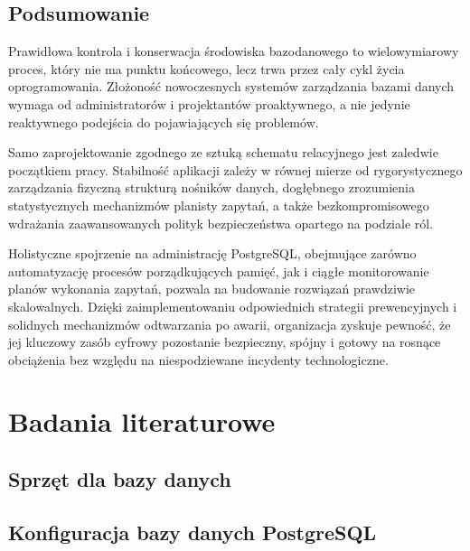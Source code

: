 \documentclass[letterpaper,10pt,english]{sphinxmanual}
\begin{document}
\section{Podsumowanie}
\label{\detokenize{rozdzial_1/index:podsumowanie}}
\sphinxAtStartPar
Prawidłowa kontrola i konserwacja środowiska bazodanowego to wielowymiarowy proces, który nie ma punktu końcowego, lecz trwa przez cały cykl życia oprogramowania. Złożoność nowoczesnych systemów zarządzania bazami danych wymaga od administratorów i projektantów proaktywnego, a nie jedynie reaktywnego podejścia do pojawiających się problemów.

\sphinxAtStartPar
Samo zaprojektowanie zgodnego ze sztuką schematu relacyjnego jest zaledwie początkiem pracy. Stabilność aplikacji zależy w równej mierze od rygorystycznego zarządzania fizyczną strukturą nośników danych, dogłębnego zrozumienia statystycznych mechanizmów planisty zapytań, a także bezkompromisowego wdrażania zaawansowanych polityk bezpieczeństwa opartego na podziale ról.

\sphinxAtStartPar
Holistyczne spojrzenie na administrację PostgreSQL, obejmujące zarówno automatyzację procesów porządkujących pamięć, jak i ciągłe monitorowanie planów wykonania zapytań, pozwala na budowanie rozwiązań prawdziwie skalowalnych. Dzięki zaimplementowaniu odpowiednich strategii prewencyjnych i solidnych mechanizmów odtwarzania po awarii, organizacja zyskuje pewność, że jej kluczowy zasób cyfrowy pozostanie bezpieczny, spójny i gotowy na rosnące obciążenia bez względu na niespodziewane incydenty technologiczne.

\sphinxstepscope


\chapter{Badania literaturowe}
\label{\detokenize{rozdzial_2/index:badania-literaturowe}}\label{\detokenize{rozdzial_2/index::doc}}
\sphinxstepscope


\section{Sprzęt dla bazy danych}
\label{\detokenize{rozdzial_2/rozdzial_21/index:sprzet-dla-bazy-danych}}\label{\detokenize{rozdzial_2/rozdzial_21/index::doc}}
\sphinxstepscope


\section{Konfiguracja bazy danych PostgreSQL}
\label{\detokenize{rozdzial_2/rozdzial_22/index:konfiguracja-bazy-danych-postgresql}}\label{\detokenize{rozdzial_2/rozdzial_22/index::doc}}
\end{document}
